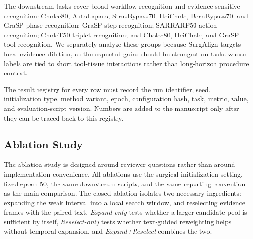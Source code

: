 The downstream tasks cover broad workflow recognition and evidence-sensitive recognition: Cholec80, AutoLaparo, StrasBypass70, HeiChole, BernBypass70, and GraSP phase recognition; GraSP step recognition; SARRARP50 action recognition; CholeT50 triplet recognition; and Cholec80, HeiChole, and GraSP tool recognition. We separately analyze these groups because SurgAlign targets local evidence dilution, so the expected gains should be strongest on tasks whose labels are tied to short tool-tissue interactions rather than long-horizon procedure context.

The result registry for every row must record the run identifier, seed, initialization type, method variant, epoch, configuration hash, task, metric, value, and evaluation-script version. Numbers are added to the manuscript only after they can be traced back to this registry.

\subsection{Ablation Study}
\label{sec:exp_ablation}

The ablation study is designed around reviewer questions rather than around implementation convenience. All ablations use the surgical-initialization setting, fixed epoch 50, the same downstream scripts, and the same reporting convention as the main comparison. The closed ablation isolates two necessary ingredients: expanding the weak interval into a local search window, and reselecting evidence frames with the paired text. \emph{Expand-only} tests whether a larger candidate pool is sufficient by itself, \emph{Reselect-only} tests whether text-guided reweighting helps without temporal expansion, and \emph{Expand+Reselect} combines the two.

